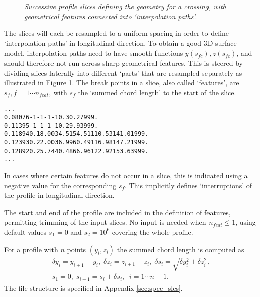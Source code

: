 \documentclass[12pt]{report}
\begin{document}
\begin{figure}[bt]
\centering
{}
\caption{\em Successive profile slices defining the geometry for a crossing,
        with geometrical features connected into `interpolation paths'.}
\label{fig:slcs_features}
\end{figure}

The slices will each be resampled to a uniform spacing in order to define
`interpolation paths' in longitudinal direction. To obtain a good 3D
surface model, interpolation paths need to have smooth functions $y(s_{fc}),
z(s_{fc})$, and should therefore not run across sharp geometrical features.
This is steered by dividing slices laterally into different `parts' that are
resampled separately as illustrated in Figure \ref{fig:slcs_features}. The
break points in a slice, also called `features', are $s_f, f=1\cdots
n_{feat}$, with $s_f$ the `summed chord length' to the start of the slice. 

\begin{alltt}\small
%  - S_F positions at geometrical features at start/end of each part per slice
%  S_SLC    S_F,  F = 1 .. NFEAT
          ...
 0.08076     -1      -1       -1       -1       0.      30.27   999.
 0.11395     -1      -1       -1       -1       0.      29.93   999.
 0.11894      0.    18.00    34.51    54.51   110.53   141.01   999.
 0.12393      0.    22.00    36.99    60.49   116.98   147.21   999.
 0.12892      0.    25.74    40.48    66.96   122.92   153.63   999.
          ...
\end{alltt}
In cases where certain features do not occur in a slice, this is indicated
using a negative value for the corresponding $s_f$. This implicitly defines
`interruptions' of the profile in longitudinal direction.

The start and end of the profile are included in the definition of features,
permitting trimming of the input slices. No input is needed when
$n_{feat}\le 1$, using default values $s_1=0$ and $s_2=10^6$ covering the
whole profile. 

For a profile with $n$ points $(y_i,z_i)$ the summed chord length is computed
as
\begin{eqnarray}
    \delta y_i = y_{i+1}-y_i, \;
    \delta z_i = z_{i+1}-z_i, \;
    \delta s_i = \sqrt{ \delta y_i^2 + \delta z_i^2 }, \nonumber \\
    s_1 = 0, \; s_{i+1} = s_i + \delta s_i , \;\;
                i = 1 \cdots n-1.
\end{eqnarray}
The file-structure is specified in Appendix \ref{sec:spec_slcs}.
\end{document}
